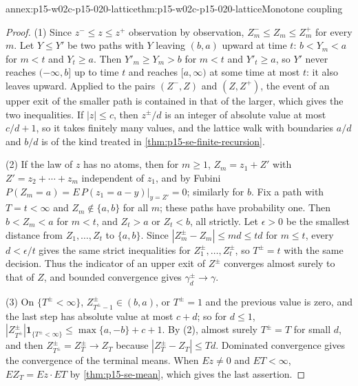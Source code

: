 \begin{annexitem}{annex:p15-w02c-p15-020-lattice}{thm:p15-w02c-p15-020-lattice}{Monotone coupling}
\begin{proof}
(1) Since \(z^-\leq z\leq z^+\) observation by observation,
\(Z^-_m\leq Z_m\leq Z^+_m\) for every \(m\). Let \(Y\leq Y'\) be two
paths with \(Y\) leaving \((b,a)\) upward at time \(t\): \(b<Y_m<a\) for
\(m<t\) and \(Y_t\geq a\). Then \(Y'_m\geq Y_m>b\) for \(m<t\) and
\(Y'_t\geq a\), so \(Y'\) never reaches \((-\infty,b]\) up to time
\(t\) and reaches \([a,\infty)\) at some time at most \(t\): it also
leaves upward. Applied to the pairs \((Z^-,Z)\) and \((Z,Z^+)\), the
event of an upper exit of the smaller path is contained in that of the
larger, which gives the two inequalities. If \(|z|\leq c\), then
\(z^\pm/d\) is an integer of absolute value at most \(c/d+1\), so it
takes finitely many values, and the lattice walk with boundaries
\(a/d\) and \(b/d\) is of the kind treated in
\cref{thm:p15-se-finite-recursion}.

(2) If the law of \(z\) has no atoms, then for \(m\geq1\),
\(Z_m=z_1+Z'\) with \(Z'=z_2+\cdots+z_m\) independent of \(z_1\), and by
Fubini \(P(Z_m=a)=E\,P(z_1=a-y)|_{y=Z'}=0\); similarly for \(b\).
Fix a path with \(T=t<\infty\) and \(Z_m\notin\{a,b\}\) for all \(m\);
these paths have probability one. Then \(b<Z_m<a\) for \(m<t\), and
\(Z_t>a\) or \(Z_t<b\), all strictly. Let \(\epsilon>0\) be the smallest
distance from \(Z_1,\ldots,Z_t\) to \(\{a,b\}\). Since
\(|Z^\pm_m-Z_m|\leq md\leq td\) for \(m\leq t\), every \(d<\epsilon/t\)
gives the same strict inequalities for \(Z^\pm_1,\ldots,Z^\pm_t\), so
\(T^\pm=t\) with the same decision. Thus the indicator of an upper exit
of \(Z^\pm\) converges almost surely to that of \(Z\), and bounded
convergence gives \(\gamma^\pm_d\to\gamma\).

(3) On \(\{T^\pm<\infty\}\), \(Z^\pm_{T^\pm-1}\in(b,a)\), or
\(T^\pm=1\) and the previous value is zero, and the last step has
absolute value at most \(c+d\); so for \(d\leq1\),
\(|Z^\pm_{T^\pm}|\mathbf1_{\{T^\pm<\infty\}}\leq\max\{a,-b\}+c+1\). By
(2), almost surely \(T^\pm=T\) for small \(d\), and then
\(Z^\pm_{T^\pm}=Z^\pm_T\to Z_T\) because \(|Z^\pm_T-Z_T|\leq Td\).
Dominated convergence gives the convergence of the terminal means. When
\(Ez\neq0\) and \(ET<\infty\), \(EZ_T=Ez\cdot ET\) by
\cref{thm:p15-se-mean}, which gives the last assertion.
\end{proof}
\end{annexitem}

